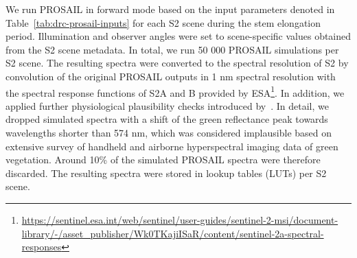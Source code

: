 We run PROSAIL in forward mode based on the input parameters denoted in Table~\ref{tab:drc-prosail-inputs} for each \gls{S2} scene during the stem elongation period. Illumination and observer angles were set to scene-specific values obtained from the \gls{S2} scene metadata. In total, we run 50 000 PROSAIL simulations per \gls{S2} scene. The resulting spectra were converted to the spectral resolution of \gls{S2} by convolution of the original PROSAIL outputs in 1 nm spectral resolution with the spectral response functions of \gls{S2}A and B provided by ESA\footnote{\url{https://sentinel.esa.int/web/sentinel/user-guides/sentinel-2-msi/document-library/-/asset_publisher/Wk0TKajiISaR/content/sentinel-2a-spectral-responses}}. In addition, we applied further physiological plausibility checks introduced by~\cite{wocher_rtm-based_2020}. In detail, we dropped simulated spectra with a shift of the green reflectance peak towards wavelengths shorter than 574 nm, which was considered implausible based on extensive survey of handheld and airborne hyperspectral imaging data of green vegetation. Around 10\% of the simulated PROSAIL spectra were therefore discarded. The resulting spectra were stored in lookup tables (\gls{LUT}s) per \gls{S2} scene.

